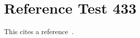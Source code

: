 \documentclass{article}
\begin{document}
\section{Reference Test 433}
This cites a reference~\cite{test433}.

\end{document}
